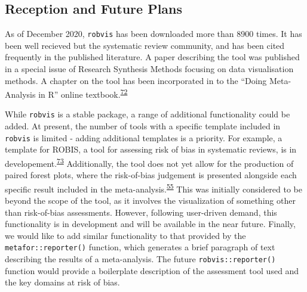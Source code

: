 \documentclass[a4paper, twoside]{templates/ociamthesis}
\newcommand*{\bibtitle}{Bibliography}
\begin{document}
\hypertarget{reception-and-future-plans-1}{%
\subsection{Reception and Future Plans}\label{reception-and-future-plans-1}}

As of December 2020, \texttt{robvis} has been downloaded more than 8900 times. It has been well recieved but the systematic review community, and has been cited frequently in the published literature. A paper describing the tool was published in a special issue of Research Synthesis Methods focusing on data visualisation methods. A chapter on the tool has been incorporated in to the ``Doing Meta-Analysis in R'' online textbook.\textsuperscript{\protect\hyperlink{ref-mathias_harrer_2019_2551803}{72}}

While \texttt{robvis} is a stable package, a range of additional functionality could be added. At present, the number of tools with a specific template included in \texttt{robvis} is limited - adding additional templates is a priority. For example, a template for ROBIS, a tool for assessing risk of bias in systematic reviews, is in developement.\textsuperscript{\protect\hyperlink{ref-whiting2016robis}{73}} Additionally, the tool does not yet allow for the production of paired forest plots, where the risk-of-bias judgement is presented alongside each specific result included in the meta-analysis.\textsuperscript{\protect\hyperlink{ref-cochranechpt7}{55}} This was initially considered to be beyond the scope of the tool, as it involves the visualization of something other than risk-of-bias assessments. However, following user-driven demand, this functionality is in development and will be available in the near future. Finally, we would like to add similar functionality to that provided by the \texttt{metafor::reporter()} function, which generates a brief paragraph of text describing the results of a meta-analysis. The future \texttt{robvis::reporter()} function would provide a boilerplate description of the assessment tool used and the key domains at risk of bias.




\setlength{\baselineskip}{0pt} %

{\renewcommand*\MakeUppercase[1]{#1}%
\printbibliography[heading=bibintoc,title={\bibtitle}]}
\end{document}
